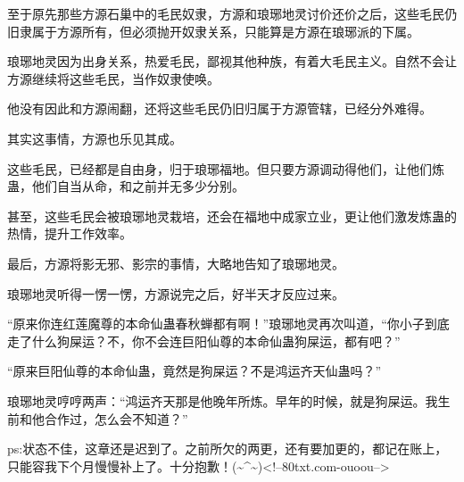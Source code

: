 \begin{this_body}
至于原先那些方源石巢中的毛民奴隶，方源和琅琊地灵讨价还价之后，这些毛民仍旧隶属于方源所有，但必须抛开奴隶关系，只能算是方源在琅琊派的下属。

琅琊地灵因为出身关系，热爱毛民，鄙视其他种族，有着大毛民主义。自然不会让方源继续将这些毛民，当作奴隶使唤。

他没有因此和方源闹翻，还将这些毛民仍旧归属于方源管辖，已经分外难得。

其实这事情，方源也乐见其成。

这些毛民，已经都是自由身，归于琅琊福地。但只要方源调动得他们，让他们炼蛊，他们自当从命，和之前并无多少分别。

甚至，这些毛民会被琅琊地灵栽培，还会在福地中成家立业，更让他们激发炼蛊的热情，提升工作效率。

最后，方源将影无邪、影宗的事情，大略地告知了琅琊地灵。

琅琊地灵听得一愣一愣，方源说完之后，好半天才反应过来。

“原来你连红莲魔尊的本命仙蛊春秋蝉都有啊！”琅琊地灵再次叫道，“你小子到底走了什么狗屎运？不，你不会连巨阳仙尊的本命仙蛊狗屎运，都有吧？”

“原来巨阳仙尊的本命仙蛊，竟然是狗屎运？不是鸿运齐天仙蛊吗？”

琅琊地灵哼哼两声：“鸿运齐天那是他晚年所炼。早年的时候，就是狗屎运。我生前和他合作过，怎么会不知道？”

ps:状态不佳，这章还是迟到了。之前所欠的两更，还有要加更的，都记在账上，只能容我下个月慢慢补上了。十分抱歉！(\~{}\^{}\~{})<!--80txt.com-ouoou-->

\end{this_body}

